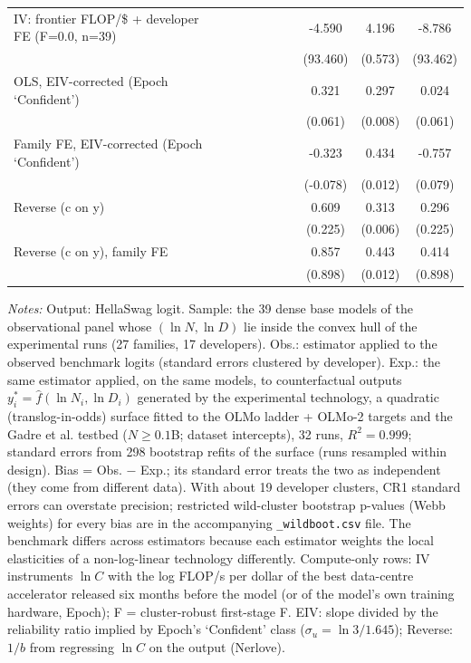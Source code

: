 \begin{table}[!htbp]
\begin{threeparttable}
\begin{tabular}{lccccccccc}
IV: frontier FLOP/\$ + developer FE (F=0.0, n=39) &  &  &  &  &  &  & -4.590 & 4.196 & -8.786 \\
 &  &  &  &  &  &  & (93.460) & (0.573) & (93.462) \\
OLS, EIV-corrected (Epoch `Confident') &  &  &  &  &  &  & 0.321 & 0.297 & 0.024 \\
 &  &  &  &  &  &  & (0.061) & (0.008) & (0.061) \\
Family FE, EIV-corrected (Epoch `Confident') &  &  &  &  &  &  & -0.323 & 0.434 & -0.757 \\
 &  &  &  &  &  &  & (-0.078) & (0.012) & (0.079) \\
Reverse (c on y) &  &  &  &  &  &  & 0.609 & 0.313 & 0.296 \\
 &  &  &  &  &  &  & (0.225) & (0.006) & (0.225) \\
Reverse (c on y), family FE &  &  &  &  &  &  & 0.857 & 0.443 & 0.414 \\
 &  &  &  &  &  &  & (0.898) & (0.012) & (0.898) \\
\bottomrule
\end{tabular}
\begin{tablenotes}[flushleft]
\footnotesize
\item \textit{Notes:} Output: HellaSwag logit. Sample: the 39 dense base models of the observational panel whose $(\ln N,\ln D)$ lie inside the convex hull of the experimental runs (27 families, 17 developers). Obs.: estimator applied to the observed benchmark logits (standard errors clustered by developer). Exp.: the same estimator applied, on the same models, to counterfactual outputs $y^*_i=\hat f(\ln N_i,\ln D_i)$ generated by the experimental technology, a quadratic (translog-in-odds) surface fitted to the OLMo ladder + OLMo-2 targets and the Gadre et al. testbed ($N\geq0.1$B; dataset intercepts), 32 runs, $R^2=0.999$; standard errors from 298 bootstrap refits of the surface (runs resampled within design). Bias = Obs. $-$ Exp.; its standard error treats the two as independent (they come from different data). With about 19 developer clusters, CR1 standard errors can overstate precision; restricted wild-cluster bootstrap p-values (Webb weights) for every bias are in the accompanying \texttt{\_wildboot.csv} file. The benchmark differs across estimators because each estimator weights the local elasticities of a non-log-linear technology differently. Compute-only rows: IV instruments $\ln C$ with the log FLOP/s per dollar of the best data-centre accelerator released six months before the model (or of the model's own training hardware, Epoch); F = cluster-robust first-stage F. EIV: slope divided by the reliability ratio implied by Epoch's `Confident' class ($\sigma_u=\ln 3/1.645$); Reverse: $1/b$ from regressing $\ln C$ on the output (Nerlove).
\end{tablenotes}
\end{threeparttable}
\end{table}
